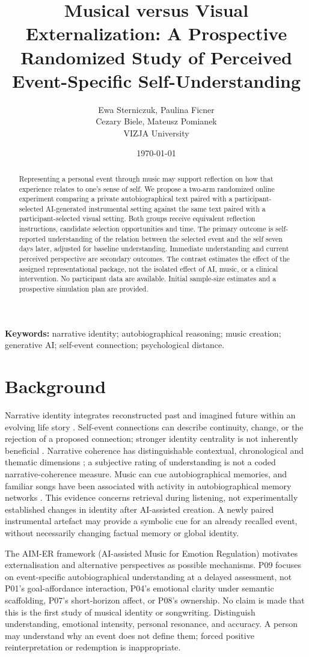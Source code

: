 \documentclass[11pt,a4paper]{article}
\title{Musical versus Visual Externalization: A Prospective Randomized Study of Perceived Event-Specific Self-Understanding}
\author{Ewa Sterniczuk, Paulina Ficner\\Cezary Biele, Mateusz Pomianek\\[0.4em]\small VIZJA University}
\date{\today}
\begin{document}
\maketitle
\begin{abstract}
Representing a personal event through music may support reflection on how that experience relates to one's sense of self. We propose a two-arm randomized online experiment comparing a private autobiographical text paired with a participant-selected AI-generated instrumental setting against the same text paired with a participant-selected visual setting. Both groups receive equivalent reflection instructions, candidate selection opportunities and time. The primary outcome is self-reported understanding of the relation between the selected event and the self seven days later, adjusted for baseline understanding. Immediate understanding and current perceived perspective are secondary outcomes. The contrast estimates the effect of the assigned representational package, not the isolated effect of AI, music, or a clinical intervention. No participant data are available. Initial sample-size estimates and a prospective simulation plan are provided.
\end{abstract}
\noindent\textbf{Keywords:} narrative identity; autobiographical reasoning; music creation; generative AI; self-event connection; psychological distance.
\section{Background}
Narrative identity integrates reconstructed past and imagined future within an evolving life story \citep{mcadams2013}. Self-event connections can describe continuity, change, or the rejection of a proposed connection; stronger identity centrality is not inherently beneficial \citep{pasupathi2007}. Narrative coherence has distinguishable contextual, chronological and thematic dimensions \citep{reese2011}; a subjective rating of understanding is not a coded narrative-coherence measure. Music can cue autobiographical memories, and familiar songs have been associated with activity in autobiographical memory networks \citep{janata2009}. This evidence concerns retrieval during listening, not experimentally established changes in identity after AI-assisted creation. A newly paired instrumental artefact may provide a symbolic cue for an already recalled event, without necessarily changing factual memory or global identity.
\par The AIM-ER framework (AI-assisted Music for Emotion Regulation) motivates externalisation and alternative perspectives as possible mechanisms. P09 focuses on event-specific autobiographical understanding at a delayed assessment, not P01's goal-affordance interaction, P04's emotional clarity under semantic scaffolding, P07's short-horizon affect, or P08's ownership. No claim is made that this is the first study of musical identity or songwriting. Distinguish understanding, emotional intensity, personal resonance, and accuracy. A person may understand why an event does not define them; forced positive reinterpretation or redemption is inappropriate.
\end{document}
